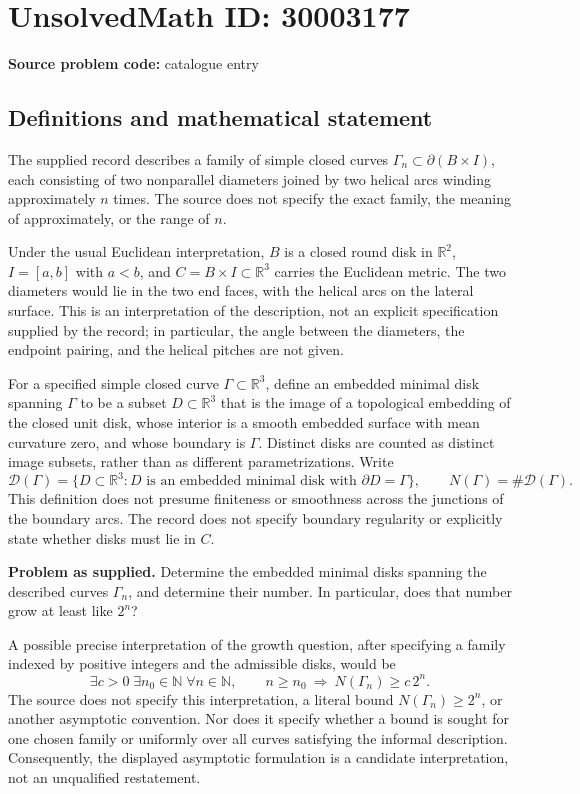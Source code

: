 \documentclass[11pt]{article}
\newcommand{\N}{\mathbb{N}}
\newcommand{\R}{\mathbb{R}}
\begin{document}
\section*{UnsolvedMath ID: 30003177}
\textbf{Source problem code:} catalogue entry
\subsection{Definitions and mathematical statement}
The supplied record describes a family of simple closed curves \(\Gamma_n\subset\partial(B\times I)\), each consisting of two nonparallel diameters joined by two helical arcs winding approximately \(n\) times. The source does not specify the exact family, the meaning of approximately, or the range of \(n\).

Under the usual Euclidean interpretation, \(B\) is a closed round disk in \(\R^2\), \(I=[a,b]\) with \(a<b\), and \(C=B\times I\subset\R^3\) carries the Euclidean metric. The two diameters would lie in the two end faces, with the helical arcs on the lateral surface. This is an interpretation of the description, not an explicit specification supplied by the record; in particular, the angle between the diameters, the endpoint pairing, and the helical pitches are not given.

For a specified simple closed curve \(\Gamma\subset\R^3\), define an embedded minimal disk spanning \(\Gamma\) to be a subset \(D\subset\R^3\) that is the image of a topological embedding of the closed unit disk, whose interior is a smooth embedded surface with mean curvature zero, and whose boundary is \(\Gamma\). Distinct disks are counted as distinct image subsets, rather than as different parametrizations. Write
\[
\mathcal D(\Gamma)=\{D\subset\R^3:D\text{ is an embedded minimal disk with }\partial D=\Gamma\},
\qquad N(\Gamma)=\#\mathcal D(\Gamma).
\]
This definition does not presume finiteness or smoothness across the junctions of the boundary arcs. The record does not specify boundary regularity or explicitly state whether disks must lie in \(C\).

\textbf{Problem as supplied.} Determine the embedded minimal disks spanning the described curves \(\Gamma_n\), and determine their number. In particular, does that number grow at least like \(2^n\)?

A possible precise interpretation of the growth question, after specifying a family indexed by positive integers and the admissible disks, would be
\[
\exists c>0\;\exists n_0\in\N\;\forall n\in\N,\qquad
n\ge n_0\ \Longrightarrow\ N(\Gamma_n)\ge c\,2^n.
\]
The source does not specify this interpretation, a literal bound \(N(\Gamma_n)\ge 2^n\), or another asymptotic convention. Nor does it specify whether a bound is sought for one chosen family or uniformly over all curves satisfying the informal description. Consequently, the displayed asymptotic formulation is a candidate interpretation, not an unqualified restatement.
\end{document}
